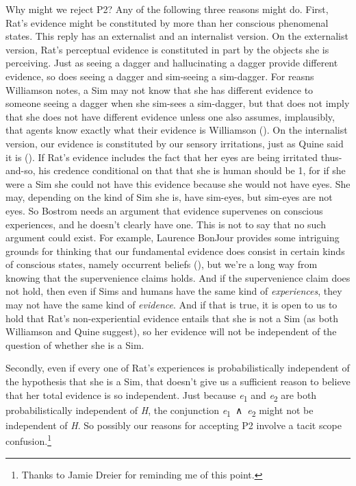 \documentclass[
  10pt,
  letterpaper,
  DIV=11,
  numbers=noendperiod,
  twoside]{scrartcl}
\begin{document}
Why might we reject P2? Any of the following three reasons might do.
First, Rat's evidence might be constituted by more than her conscious
phenomenal states. This reply has an externalist and an internalist
version. On the externalist version, Rat's perceptual evidence is
constituted in part by the objects she is perceiving. Just as seeing a
dagger and hallucinating a dagger provide different evidence, so does
seeing a dagger and sim-seeing a sim-dagger. For reasns Williamson
notes, a Sim may not know that she has different evidence to someone
seeing a dagger when she sim-sees a sim-dagger, but that does not imply
that she does not have different evidence unless one also assumes,
implausibly, that agents know exactly what their evidence is Williamson
(). On the internalist
version, our evidence is constituted by our sensory irritations, just as
Quine said it is (). If Rat's
evidence includes the fact that her eyes are being irritated
thus-and-so, his credence conditional on that that she is human should
be 1, for if she were a Sim she could not have this evidence because she
would not have eyes. She may, depending on the kind of Sim she is, have
sim-eyes, but sim-eyes are not eyes. So Bostrom needs an argument that
evidence supervenes on conscious experiences, and he doesn't clearly
have one. This is not to say that no such argument could exist. For
example, Laurence BonJour provides some intriguing grounds for thinking
that our fundamental evidence does consist in certain kinds of conscious
states, namely occurrent beliefs (), but we're a long way from knowing that the supervenience claims
holds. And if the supervenience claim does not hold, then even if Sims
and humans have the same kind of \emph{experiences}, they may not have
the same kind of \emph{evidence}. And if that is true, it is open to us
to hold that Rat's non-experiential evidence entails that she is not a
Sim (as both Williamson and Quine suggest), so her evidence will not be
independent of the question of whether she is a Sim.

Secondly, even if every one of Rat's experiences is probabilistically
independent of the hypothesis that she is a Sim, that doesn't give us a
sufficient reason to believe that her total evidence is so independent.
Just because \emph{e}\textsubscript{1} and \emph{e}\textsubscript{2} are
both probabilistically independent of \emph{H}, the conjunction
\emph{e}\textsubscript{1}~∧~\emph{e}\textsubscript{2} might not be
independent of \emph{H}. So possibly our reasons for accepting P2
involve a tacit scope confusion.\footnote{Thanks to Jamie Dreier for
  reminding me of this point.}
\end{document}
